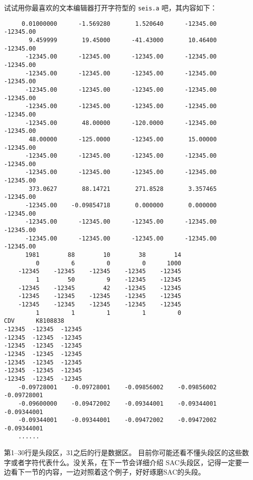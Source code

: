 试试用你最喜欢的文本编辑器打开字符型的 \texttt{seis.a} 吧，其内容如下：
\begin{verbatim}
     0.01000000      -1.569280       1.520640      -12345.00      -12345.00
       9.459999       19.45000      -41.43000       10.46400      -12345.00
      -12345.00      -12345.00      -12345.00      -12345.00      -12345.00
      -12345.00      -12345.00      -12345.00      -12345.00      -12345.00
      -12345.00      -12345.00      -12345.00      -12345.00      -12345.00
      -12345.00      -12345.00      -12345.00      -12345.00      -12345.00
      -12345.00       48.00000      -120.0000      -12345.00      -12345.00
       48.00000      -125.0000      -12345.00       15.00000      -12345.00
      -12345.00      -12345.00      -12345.00      -12345.00      -12345.00
      -12345.00      -12345.00      -12345.00      -12345.00      -12345.00
       373.0627       88.14721       271.8528       3.357465      -12345.00
      -12345.00    -0.09854718       0.000000       0.000000      -12345.00
      -12345.00      -12345.00      -12345.00      -12345.00      -12345.00
      -12345.00      -12345.00      -12345.00      -12345.00      -12345.00
      1981        88        10        38        14
         0         6         0         0      1000
    -12345    -12345    -12345    -12345    -12345
         1        50         9    -12345    -12345
    -12345    -12345        42    -12345    -12345
    -12345    -12345    -12345    -12345    -12345
    -12345    -12345    -12345    -12345    -12345
         1         1         1         1         0
CDV      K8108838
-12345  -12345  -12345
-12345  -12345  -12345
-12345  -12345  -12345
-12345  -12345  -12345
-12345  -12345  -12345
-12345  -12345  -12345
-12345  -12345  -12345
    -0.09728001    -0.09728001    -0.09856002    -0.09856002    -0.09728001
    -0.09600000    -0.09472002    -0.09344001    -0.09344001    -0.09344001
    -0.09344001    -0.09344001    -0.09472002    -0.09472002    -0.09344001
    ......
\end{verbatim}

第1--30行是头段区，31之后的行是数据区。
目前你可能还看不懂头段区的这些数字或者字符代表什么。没关系，在下一节会详细介绍
SAC头段区，记得一定要一边看下一节的内容，一边对照着这个例子，好好琢磨SAC的头段。
